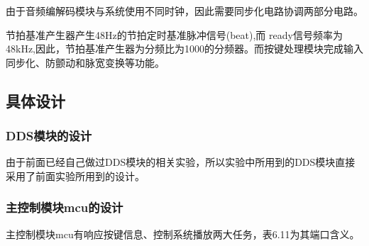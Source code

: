 \documentclass{../source/Experiment}
\begin{document}
        由于音频编解码模块与系统使用不同时钟，因此需要同步化电路协调两部分电路。
            
        节拍基准产生器产生48Hz的节拍定时基准脉冲信号(beat),而 ready信号频率为48kHz,因此，节拍基准产生器为分频比为1000的分频器。而按键处理模块完成输入同步化、防颤动和脉宽变换等功能。

        \subsection{具体设计}

            \subsubsection{DDS模块的设计}
            由于前面已经自己做过DDS模块的相关实验，所以实验中所用到的DDS模块直接采用了前面实验所用到的设计。

            
            
            \subsubsection{主控制模块mcu的设计}

                主控制模块mcu有响应按键信息、控制系统播放两大任务，表6.11为其端口含义。
\end{document}
